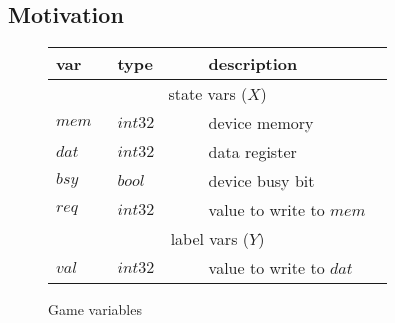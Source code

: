 \documentclass{book}
\theoremstyle{definition}
\begin{document}
\subsection{Motivation}

\begin{figure}
    \caption{Game variables}
    \begin{tabular}{|p{0.13\linewidth}p{0.22\linewidth}p{0.45\linewidth}|}
        \hline
        {\bf var} & {\bf type} & {\bf description} \\
        \hline\hline
        \multicolumn{3}{|c|}{state vars ($X$)} \\
        \hline
        $mem$ & $int32$ & device memory           \\
        $dat$ & $int32$ & data register           \\
        $bsy$ & $bool$  & device busy bit         \\
        $req$ & $int32$ & value to write to $mem$ \\
        \hline\hline
        \multicolumn{3}{|c|}{label vars ($Y$)}    \\
        \hline
        $val$ & $int32$ & value to write to $dat$ \\
        \hline
    \end{tabular}
\end{figure}
\end{document}
